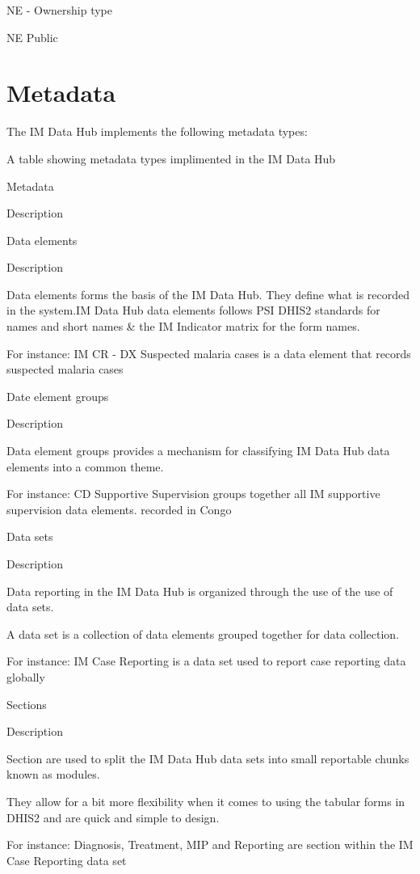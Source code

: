 \documentclass[]{book}
\begin{document}
NE - Ownership type

NE Public

\hypertarget{metadata}{%
\section{Metadata}\label{metadata}}

The IM Data Hub implements the following metadata types:

\label{tab:unnamed-chunk-14}A table showing metadata types implimented in the IM Data Hub

Metadata

Description

Data elements

Description

Data elements forms the basis of the IM Data Hub. They define what is recorded in the system.IM Data Hub data elements follows PSI DHIS2 standards for names and short names \& the IM Indicator matrix for the form names.

For instance: IM CR - DX Suspected malaria cases is a data element that records suspected malaria cases

Date element groups

Description

Data element groups provides a mechanism for classifying IM Data Hub data elements into a common theme.

For instance: CD Supportive Supervision groups together all IM supportive supervision data elements. recorded in Congo

Data sets

Description

Data reporting in the IM Data Hub is organized through the use of the use of data sets.

A data set is a collection of data elements grouped together for data collection.

For instance: IM Case Reporting is a data set used to report case reporting data globally

Sections

Description

Section are used to split the IM Data Hub data sets into small reportable chunks known as modules.

They allow for a bit more flexibility when it comes to using the tabular forms in DHIS2 and are quick and simple to design.

For instance: Diagnosis, Treatment, MIP and Reporting are section within the IM Case Reporting data set
\end{document}

